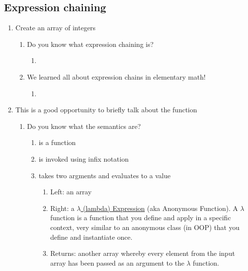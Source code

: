 \subsection{Expression chaining}
\begin{enumerate}[resume*]
\item Create an array of integers
  \begin{enumerate}
  \item Do you know what expression chaining is?
    \begin{enumerate}
    \item {}
    \end{enumerate}
  \item We learned all about expression chains in elementary math!
    \begin{enumerate}
    \item {}
    \end{enumerate}
  \end{enumerate}
\item This is a good opportunity to briefly talk about the  function
  \begin{enumerate}
  \item Do you know what the  semantics are?
    \begin{enumerate}
    \item {} is a function
    \item {} is invoked using infix notation
    \item {} takes two argments and evaluates to a value
      \begin{enumerate}
      \item Left: an array
      \item Right: a \href{https://en.wikipedia.org/wiki/Lambda\_calculus}{$\lambda$ (lambda) Expression} (aka Anonymous Function). A $\lambda$ function is a function that you define and apply in a specific context, very similar to an anonymous class (in OOP) that you define and instantiate once.
      \item Returns: another array whereby every element from the input array has been passed as an argument to the $\lambda$ function.
      \end{enumerate}
    \end{enumerate}
  \end{enumerate}
\end{enumerate}

